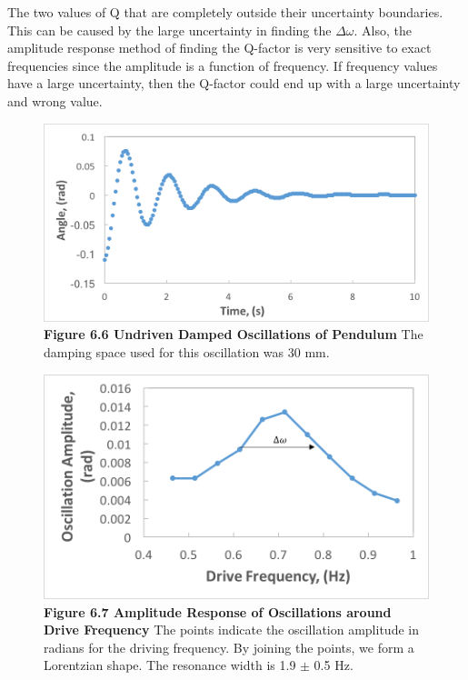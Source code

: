 \documentclass[11pt]{report}
\begin{document}
The two values of Q that are completely outside their
uncertainty boundaries. This can be caused by the large uncertainty in
finding the $\Delta\omega$. Also, the amplitude response method of
finding the Q-factor is very sensitive to exact frequencies since the amplitude is
a function of frequency. If frequency values have a large uncertainty,
then the Q-factor could end up with a large uncertainty and wrong value.


\begin{figure}
    \includegraphics[width=\linewidth]{LowDamping.png}
    \captionsetup{labelformat=empty}
    \caption{\textbf{Figure 6.6 Undriven Damped Oscillations of Pendulum} The
    damping space used for this oscillation was 30 mm.}
\end{figure}

\begin{figure}
    \includegraphics[width=\linewidth]{DriveFrequencyAmplitude.png}
    \captionsetup{labelformat=empty}
    \caption{\textbf{Figure 6.7 Amplitude Response of Oscillations around Drive
    Frequency} The points indicate the oscillation amplitude in radians for the
driving frequency.  By joining the points, we form a Lorentzian shape. The
resonance width is 1.9 $\pm$ 0.5 Hz.}
\end{figure}
\end{document}

